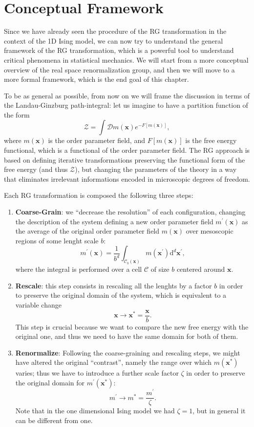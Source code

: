 \section{Conceptual Framework} 

Since we have already seen the procedure of the RG transformation in the context of the 1D Ising model, we can now try to understand the general framework of the RG transformation, which is a powerful tool to understand critical phenomena in statistical mechanics. We will start from a more conceptual overview of the real space renormalization group, and then we will move to a more formal framework, which is the end goal of this chapter.

To be as general as possible, from now on we will frame the discussion in terms of the Landau-Ginzburg path-integral: let us imagine to have a partition function of the form
\[
    \mathcal{Z} = \int \mathcal{D} m(\mathbf{x}) e^{-F[m(\mathbf{x})]},
\]
where \(m(\mathbf{x})\) is the order parameter field, and \(F[m(\mathbf{x})]\) is the free energy functional, which is a functional of the order parameter field. The RG approach is based on defining iterative transformations preserving the functional form of the free energy (and thus \(\mathcal{Z}\)), but changing the parameters of the theory in a way that eliminates irrelevant informations encoded in microscopic degrees of freedom.

Each RG transformation is composed the following three steps:
\begin{enumerate}
    \item \textbf{Coarse-Grain}: we ``decrease the resolution'' of each configuration, changing the description of the system defining a new order parameter field \(m^{\prime}(\mathbf{x})\) as the average of the original order parameter field \(m(\mathbf{x})\) over mesoscopic regions of some lenght scale \(b\):
          \[
              m^{\prime}(\mathbf{x}) = \frac{1}{b^d} \int_{\mathcal{C}_b(\mathbf{x})} m(\mathbf{x}^{\prime}) \mathrm{d}^d \mathbf{x}^{\prime},
          \]
          where the integral is performed over a cell \(\mathcal{C}\) of size \(b\) centered around \(\mathbf{x}\).
    \item \textbf{Rescale}: this step consists in rescaling all the lenghts by a factor \(b\) in order to preserve the original domain of the system, which is equivalent to a variable change
          \[
              \mathbf{x} \to \mathbf{x}^{*} = \frac{\mathbf{x}}{b}.
          \]
          This step is crucial because we want to compare the new free energy with the original one, and thus we need to have the same domain for both of them.
    \item \textbf{Renormalize}: Following the coarse-graining and rescaling steps, we might have altered the original ``contrast'', namely the range over which \(m(\mathbf{x}^{*})\) varies; thus we have to introduce a further scale factor \(\zeta\) in order to preserve the original domain for \(m^{\prime}(\mathbf{x}^{*})\):
          \[
              m^{\prime} \to m^* = \frac{m^{\prime}}{\zeta}.
          \]
          Note that in the one dimensional Ising model we had \(\zeta = 1\), but in general it can be different from one.
\end{enumerate}

